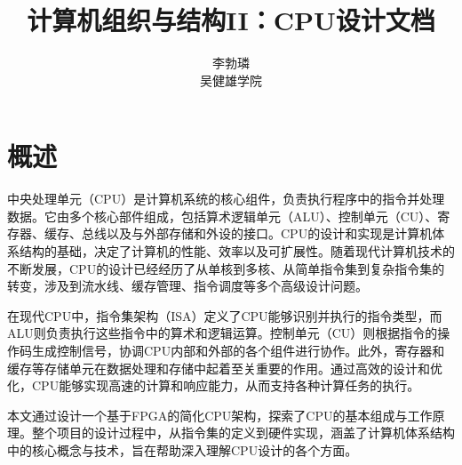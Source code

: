 \documentclass[lang=cn,a4paper,newtx]{elegantpaper}
\title{计算机组织与结构II：CPU设计文档}
\author{李勃璘 \\ 吴健雄学院}
\date{\zhdate{2025/4/25}}
\begin{document}
\maketitle
\thispagestyle{empty}
\begin{abstract}

\end{abstract}








\newpage
{}
\tableofcontents
\newpage
\listoftables
\newpage
{}
\section{概述}
中央处理单元（CPU）是计算机系统的核心组件，负责执行程序中的指令并处理数据。它由多个核心部件组成，包括算术逻辑单元（ALU）、控制单元（CU）、寄存器、缓存、总线以及与外部存储和外设的接口。CPU的设计和实现是计算机体系结构的基础，决定了计算机的性能、效率以及可扩展性。随着现代计算机技术的不断发展，CPU的设计已经经历了从单核到多核、从简单指令集到复杂指令集的转变，涉及到流水线、缓存管理、指令调度等多个高级设计问题。

在现代CPU中，指令集架构（ISA）定义了CPU能够识别并执行的指令类型，而ALU则负责执行这些指令中的算术和逻辑运算。控制单元（CU）则根据指令的操作码生成控制信号，协调CPU内部和外部的各个组件进行协作。此外，寄存器和缓存等存储单元在数据处理和存储中起着至关重要的作用。通过高效的设计和优化，CPU能够实现高速的计算和响应能力，从而支持各种计算任务的执行。

本文通过设计一个基于FPGA的简化CPU架构，探索了CPU的基本组成与工作原理。整个项目的设计过程中，从指令集的定义到硬件实现，涵盖了计算机体系结构中的核心概念与技术，旨在帮助深入理解CPU设计的各个方面。
\end{document}
